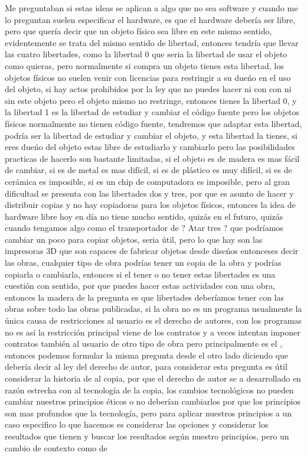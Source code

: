 \begin{multicols}{2}
Me preguntaban  si estas ideas se aplican a algo que no sea software y cuando me lo preguntan suelen especificar el hardware, es que el hardware debería ser libre, pero que quería decir que un objeto físico sea libre en este mismo sentido, evidentemente se trata del mismo sentido de libertad, entonces tendría que llevar las cuatro libertades, como la libertad 0 que seria la libertad de usar el objeto como quieras, pero normalmente si compra un objeto tienes esta libertad, los objetos físicos no suelen venir con licencias para restringir a su dueńo en el uso del objeto, si hay actos prohibidos por la ley que no puedes hacer ni con con ni sin este objeto pero el objeto mismo no restringe, entonces tienes la libertad 0, y la libertad 1 es la libertad de estudiar y cambiar el código fuente pero los objetos físicos normalmente no tienen código fuente, tendremos que adaptar esta libertad, podría ser la libertad de estudiar y cambiar el objeto, y esta libertad la tienes, si eres dueńo del objeto estas libre de estudiarlo y cambiarlo pero las posibilidades practicas de hacerlo son bastante limitadas, si el objeto es de madera es mas fácil de cambiar, si es de metal es mas difícil, si es de plástico es muy difícil, si es de cerámica es imposible, si es un chip de computadora es imposible, pero al gran dificultad se presenta con las libertades dos y tres, por que es asunto de hacer y distribuir copias y no hay copiadoras para los objetos físicos, entonces la idea de hardware libre hoy en día no tiene mucho sentido, quizás en el futuro, quizás cuando tengamos algo como el transportador de ? Atar tres ? que podríamos cambiar un poco para copiar objetos, seria útil, pero lo que hay son las impresoras 3D que son capaces de fabricar objetos desde diseńos entonces{\em {\color{introcolor}{ estos diseńos  son obras, no son objetos, son obras y son ejemplos de una gran categoría de cosas para las cuales esta pregunta si tiene sentido, }}}es decir las obras, cualquier tipo de obra podrías tener un copia de la obra y podrías copiarla o cambiarla, entonces si el tener o no tener estas libertades es una cuestión con sentido, por que puedes hacer estas actividades con una obra, entonces la madera de la pregunta es que libertades deberíamos tener con las obras sobre todo las obras publicadas, si la obra no es un programa usualmente la única causa de restricciones al usuario es el derecho de autores, con los programas no es así la restricción principal viene de los contratos y a veces intentan imponer contratos también al usuario de otro tipo de obra pero principalmente es el {\em {\color{introcolor}{ derecho de autor }}} , entonces podemos formular la misma pregunta desde el otro lado diciendo que debería decir al ley del derecho de autor, para considerar esta pregunta es útil considerar la historia de al copia, por que el derecho de autor se a desarrollado en razón estrecha con al tecnología de la copia, los cambios tecnológicos no pueden cambiar nuestros principios éticos o no deberían cambiarlos por que los principios son mas profundos que la tecnología, pero para aplicar nuestros principios a un caso especifico lo que hacemos es considerar las opciones y considerar los resultados que tienen y buscar los resultados según nuestro principios, pero un cambio de contexto como de 
\end{multicols}
